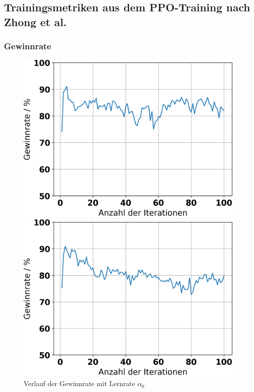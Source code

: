 

\subsection{Trainingsmetriken aus dem PPO-Training nach Zhong et al.}

\subsubsection{Gewinnrate}

\begin{figure}[H]
	\begin{minipage}[c]{0.32\linewidth}
		\includegraphics[width=\linewidth]{Bilder/ensemble-training/a_0_001/graph_win_rates.png}
		\caption{Verlauf der Gewinnrate mit Lernrate $\alpha_0$}
	\end{minipage}
	\hfill
	\begin{minipage}[c]{0.32\linewidth}
		\includegraphics[width=\linewidth]{Bilder/ensemble-training/b_0_0003/graph_win_rates.png}

\end{minipage}
\end{figure}
